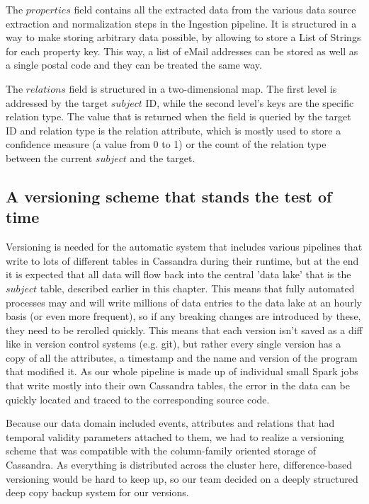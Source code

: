 \documentclass[
        a4paper,     %
        titlepage,   %
        oneside,     %
        parskip      %
]{scrartcl}          %
\begin{document}
    The $properties$ field contains all the extracted data from the various
    data source extraction and normalization steps in the Ingestion pipeline.
    It is structured in a way to make storing arbitrary data possible, by allowing
    to store a List of Strings for each property key. This way, a list of
    eMail addresses can be stored as well as a single postal code and they can
    be treated the same way.

    The $relations$ field is structured in a two-dimensional map. The first level
    is addressed by the target $subject$ ID, while the second level's keys are the
    specific relation type. The value that is returned when the field is queried
    by the target ID and relation type is the relation attribute, which is mostly
    used to store a confidence measure (a value from 0 to 1) or the count of the
    relation type between the current $subject$ and the target.

    \subsection{A versioning scheme that stands the test of time}
    Versioning is needed for the automatic system that includes various pipelines
    that write to lots of different tables in Cassandra during their runtime,
    but at the end it is expected that all data will flow back into the central
    'data lake' that is the $subject$ table, described earlier in this chapter.
    This means that fully automated processes may and will write millions of
    data entries to the data lake at an hourly basis (or even more frequent),
    so if any breaking changes are introduced by these, they need to be rerolled quickly.
    This means that each version isn't saved as a diff like in version control systems
    (e.g. git), but rather every single version has a copy of all the attributes,
    a timestamp and the name and version of the program that modified it.
    As our whole pipeline is made up of individual small Spark jobs that write
    mostly into their own Cassandra tables, the error in the data can be quickly
    located and traced to the corresponding source code.

    Because our data domain included events, attributes and relations that had
    temporal validity parameters attached to them, we had to realize a versioning
    scheme that was compatible with the column-family oriented storage of Cassandra.
    As everything is distributed across the cluster here, difference-based versioning
    would be hard to keep up, so our team decided on a deeply structured deep copy
    backup system for our versions.
\end{document}

